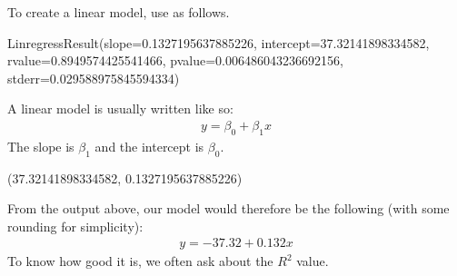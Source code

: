 \documentclass[letterpaper,10pt,english]{sphinxmanual}
\begin{document}
To create a linear model, use  as follows.

\begin{sphinxVerbatim}[commandchars=\\\{\}]
     
\end{sphinxVerbatim}

\begin{sphinxVerbatim}[commandchars=\\\{\}]
LinregressResult(slope=0.1327195637885226, intercept=\PYGZhy{}37.32141898334582, rvalue=0.8949574425541466, pvalue=0.006486043236692156, stderr=0.029588975845594334)
\end{sphinxVerbatim}

A linear model is usually written like so:
\begin{equation*}
\begin{split} y = \beta_0 + \beta_1 x \end{split}
\end{equation*}
The slope is \(\beta_1\) and the intercept is \(\beta_0\).

\begin{sphinxVerbatim}[commandchars=\\\{\}]
  
  
 
\end{sphinxVerbatim}

\begin{sphinxVerbatim}[commandchars=\\\{\}]
(\PYGZhy{}37.32141898334582, 0.1327195637885226)
\end{sphinxVerbatim}

From the output above, our model would therefore be the following (with some rounding for simplicity):
\begin{equation*}
\begin{split} y = -37.32 + 0.132x \end{split}
\end{equation*}
To know how good it is, we often ask about the \(R^2\) value.

\begin{sphinxVerbatim}[commandchars=\\\{\}]
  
 
\end{sphinxVerbatim}
\end{document}
